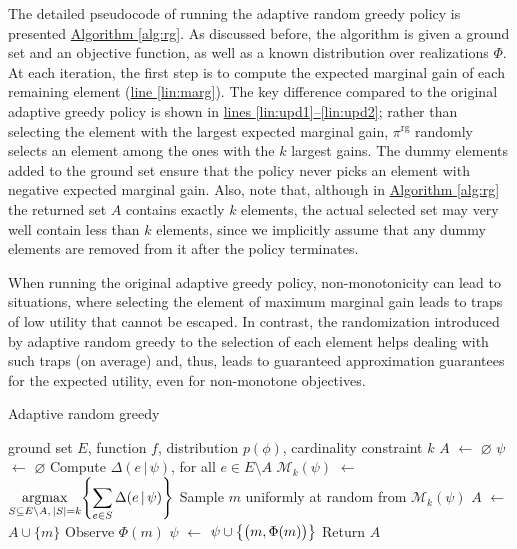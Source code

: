 \documentclass{article}
\newcommand{\algoref}[1]{\hyperref[#1]{Algorithm \ref*{#1}}}
\newcommand{\lineref}[1]{\hyperref[#1]{line \ref*{#1}}}
\newcommand{\linesref}[2]{\hyperref[#1]{lines \ref*{#1}--\ref*{#2}}}
\newcommand*\LET[2]{\STATE #1 $\gets$ #2}
\newcommand{\argmax}{\operatornamewithlimits{argmax}}
\let\originalleft\left
\let\originalright\right
\renewcommand{\left}{\mathopen{}\mathclose\bgroup\originalleft}
\renewcommand{\right}{\aftergroup\egroup\originalright}
\newcommand{\mmid}{\,\vert\,}
\newcommand{\D}[2]{\Delta(#1\mmid#2)}
\newcommand{\pig}{\pi^{\textrm{rg}}}
\newcommand{\Mk}{\mathcal{M}_k}
\begin{document}
The detailed pseudocode of running the adaptive random greedy policy is presented \algoref{alg:rg}.
As discussed before, the algorithm is given a ground set and an objective function, as well as a known distribution over realizations $\Phi$.
At each iteration, the first step is to compute the expected marginal gain of each remaining element (\lineref{lin:marg}).
The key difference compared to the original adaptive greedy policy is shown in \linesref{lin:upd1}{lin:upd2}; rather than selecting the element with the largest expected marginal gain, $\pig$ randomly selects an element among the ones with the $k$ largest gains.
The dummy elements added to the ground set ensure that the policy never picks an element with negative expected marginal gain.
Also, note that, although in \algoref{alg:rg} the returned set $A$ contains exactly $k$ elements, the actual selected set may very well contain less than $k$ elements, since we implicitly assume that any dummy elements are removed from it after the policy terminates.

When running the original adaptive greedy policy, non-monotonicity can lead to situations, where selecting the element of maximum marginal gain leads to traps of low utility that cannot be escaped.
In contrast, the randomization introduced by adaptive random greedy to the selection of each element helps dealing with such traps (on average) and, thus, leads to guaranteed approximation guarantees for the expected utility, even for non-monotone objectives.

\begin{algorithm}[tb]
  \caption{Adaptive random greedy}
  \label{alg:rg}
  \normalsize{
    \begin{algorithmic}[1]
      \REQUIRE ground set $E$, function $f$, distribution $p(\phi)$, cardinality constraint $k$
      \LET{$A$}{$\varnothing$}
      \LET{$\psi$}{$\varnothing$}
      \STATE Compute $\D{e}{\psi}$, for all $e \in E \setminus A$ \label{lin:marg}
      \LET{$\Mk(\psi)$}{$\displaystyle\argmax_{S \subseteq E \setminus A,\,|S| = k}\left\{\sum_{e \in S} \D{e}{\psi} \right\}$} \label{lin:upd1}
      \STATE Sample $m$ uniformly at random from $\Mk(\psi)$ \label{lin:upd2}
      \LET{$A$}{$A \cup \{m\}$}
      \STATE Observe $\Phi(m)$
      \LET{$\psi$}{$\psi \cup \left\{\big(m, \Phi(m)\big)\right\}$}
      \ENDFOR
      \STATE Return $A$
    \end{algorithmic}
  }
\end{algorithm}
\end{document}
